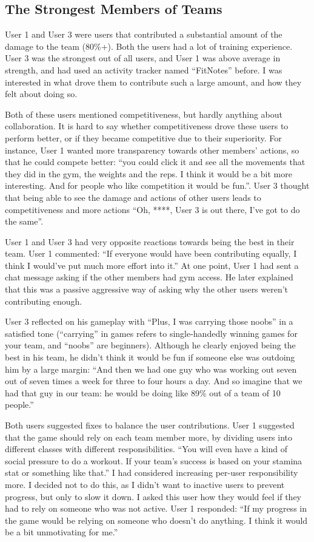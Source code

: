 \documentclass{l4proj}
\begin{document}
\subsection{The Strongest Members of Teams}
User 1 and User 3 were users that contributed a substantial amount of the damage to the team (80\%+). Both the users had a lot of training experience. User 3 was the strongest out of all users, and User 1 was above average in strength, and had used an activity tracker named ``FitNotes'' before. I was interested in what drove them to contribute such a large amount, and how they felt about doing so. 

Both of these users mentioned competitiveness, but hardly anything about collaboration. It is hard to say whether competitiveness drove these users to perform better, or if they became competitive due to their superiority. For instance, User 1 wanted more transparency towards other members' actions, so that he could compete better: ``you could click it and see all the movements that they did in the gym, the weights and the reps. I think it would be a bit more interesting. And for people who like competition it would be fun.''. User 3 thought that being able to see the damage and actions of other users leads to competitiveness and more actions ``Oh, ****, User 3 is out there, I've got to do the same''. 

User 1 and User 3 had very opposite reactions towards being the best in their team. User 1 commented: ``If everyone would have been contributing equally, I think I would've put much more effort into it.'' At one point, User 1 had sent a chat message asking if the other members had gym access. He later explained that this was a passive aggressive way of asking why the other users weren't contributing enough. 

User 3 reflected on his gameplay with ``Plus, I was carrying those noobs'' in a satisfied tone (``carrying'' in games refers to single-handedly winning games for your team, and ``noobs'' are beginners). Although he clearly enjoyed being the best in his team, he didn't think it would be fun if someone else was outdoing him by a large margin: ``And then we had one guy who was working out seven out of seven times a week for three to four hours a day. And so imagine that we had that guy in our team: he would be doing like 89\% out of a team of 10 people.'' 

Both users suggested fixes to balance the user contributions. User 1 suggested that the game should rely on each team member more, by dividing users into different classes with different responsibilities. ``You will even have a kind of social pressure to do a workout. If your team's success is based on your stamina stat or something like that.'' I had considered increasing per-user responsibility more. I decided not to do this, as I didn't want to inactive users to prevent progress, but only to slow it down. I asked this user how they would feel if they had to rely on someone who was not active. User 1 responded: ``If my progress in the game would be relying on someone who doesn't do anything. I think it would be a bit unmotivating for me.'' 
\end{document}
